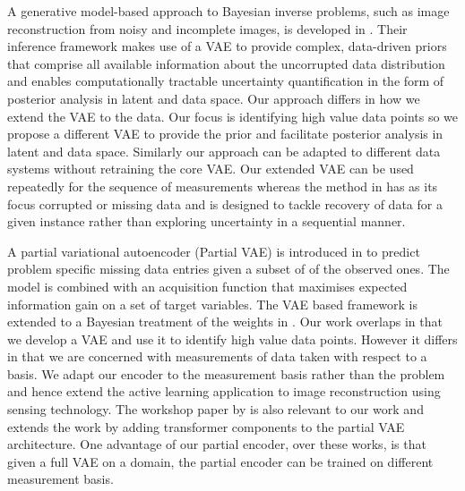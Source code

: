 A generative model-based approach to Bayesian inverse problems,
such as image reconstruction from noisy and incomplete images, is developed in \cite{Bohm:2019hpu}. Their inference framework makes use of a VAE to provide complex, data-driven priors that comprise all available information about the uncorrupted data distribution and enables computationally tractable uncertainty
quantification in the form of posterior analysis in latent and data space. Our approach differs in how we extend the VAE to the data. Our focus is identifying high value data points so we propose a different VAE to provide the prior and facilitate posterior analysis in latent and data space. Similarly our approach can be adapted to different data systems without retraining the core VAE. Our extended VAE can be used repeatedly for the sequence of measurements whereas the method in \cite{Bohm:2019hpu} has as its focus corrupted or missing data and is designed to tackle recovery of data for a given instance rather than exploring uncertainty in a sequential manner.

A partial variational autoencoder (Partial VAE) is introduced in \cite{pmlr-v97-ma19c} to predict problem specific missing data entries given a subset of of the observed ones. The model is combined with an acquisition function that maximises expected information gain on a set of target variables. The VAE based framework is extended to a Bayesian treatment of the weights in \cite{ma2019bayesian}. Our work overlaps in that we develop a VAE and use it to identify high value data points. However it differs in that we are concerned with measurements of data taken with respect to a basis. We adapt our encoder to the measurement basis rather than the problem and hence extend the active learning application to image reconstruction using sensing technology. The workshop paper by \cite{Saar_Tsechansky_2009} is also relevant to our work and extends the work \citep{pmlr-v97-ma19c} by adding transformer components to the partial VAE architecture. One advantage of our partial encoder, over these works, is that given a full VAE on a domain, the partial encoder can be trained on different measurement basis.

